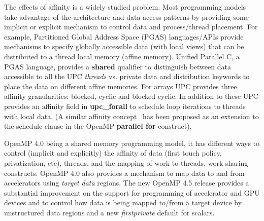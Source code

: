 The effects of affinity is a widely studied problem. Most programming models 
take advantage of the architecture and data-access patterns by providing some 
implicit or explicit mechanism to control data and process/thread placement. For example,
Partitioned Global Address Space (PGAS) languages/APIs provide mechanisms to specify 
globally accessible data (with local views) that can be distributed to a thread local memory (affine memory). 
Unified Parallel C, a PGAS language, provides a \textbf{shared} qualifier to distinguish between data 
accessible to all the UPC \textit{threads} vs. private data and distribution keywords to place
the data on different affine memories. For arrays UPC provides 
three affinity granularities: blocked, cyclic and blocked-cyclic. In addition to these
UPC provides an affinity field in \textbf{upc\_forall} to schedule loop iterations to threads with local data.
(A similar affinity concept~\cite{nikolopoulos2001exploiting} has been proposed as an extension to the schedule clause in the OpenMP \textbf{parallel for} construct).

OpenMP 4.0 being a shared memory programming model, it has 
different ways to control (implicit and explicitly) the affinity of data (first touch policy, privatization, etc), threads, and the mapping of work to threads.
work-sharing constructs. OpenMP 4.0 also provides a mechanism to map data to and from accelerators using \textit{target data} regions. The new OpenMP 4.5 release provides a substantial 
improvement on the support for programming of accelerator and GPU devices and to control
how data is being mapped to/from a target device by unstructured data regions and a new \textit{firstprivate} default for scalars.

